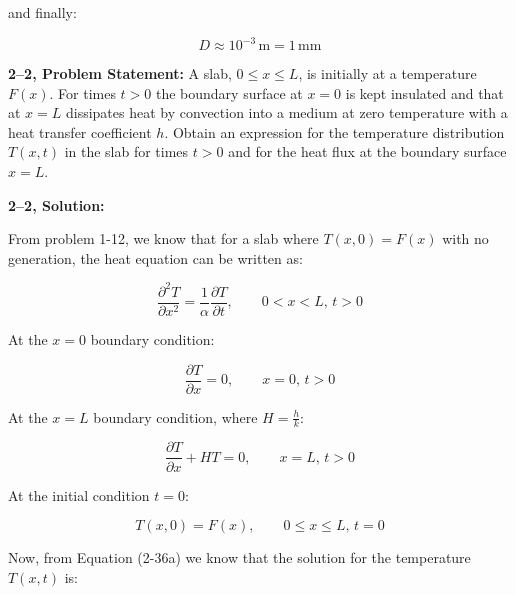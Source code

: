 \documentclass[letterpaper,12pt]{article}
\begin{document}
and finally:

\begin{equation}
\boxed{
    D \approx 10^{-3} \, \mathrm{m} = 1 \, \mathrm{mm}
}
\end{equation}

\vspace{6pt}


\textbf{2--2, Problem Statement:}
A slab, $0 \leq x \leq L$, is initially at a temperature $F \left( x \right)$. For times $t > 0$ the boundary surface at $x = 0$ is kept insulated and that at $x = L$ dissipates heat by convection into a medium at zero temperature with a heat transfer coefficient $h$. Obtain an expression for the temperature distribution $T\left( x, t \right)$ in the slab for times $t > 0$ and for the heat flux at the boundary surface $x = L$.

\vspace{6pt}

\textbf{2--2, Solution:}

From problem 1-12, we know that for a slab where $T(x, 0) = F(x)$ with no generation, the heat equation can be written as:

\begin{equation}
\frac{\partial^2 T}{\partial x^2} = \frac{1}{\alpha} \frac{\partial T}{\partial t}, \qquad 0 < x < L, \, t > 0
\end{equation}

At the $x = 0$ boundary condition:

\begin{equation}
    \frac{\partial T}{\partial x} = 0, \qquad x = 0, \, t > 0
\end{equation}

At the $x = L$ boundary condition, where $H = \frac{h}{k}$:

\begin{equation}
    \frac{\partial T}{\partial x} + HT = 0 , \qquad x = L, \, t > 0
\end{equation}

At the initial condition $t = 0$:

\begin{equation}
    T(x, 0) = F(x), \qquad 0 \leq x \leq L, \, t = 0 
\end{equation}

Now, from Equation (2-36a) we know that the solution for the temperature $T(x, t)$ is:
\end{document}
